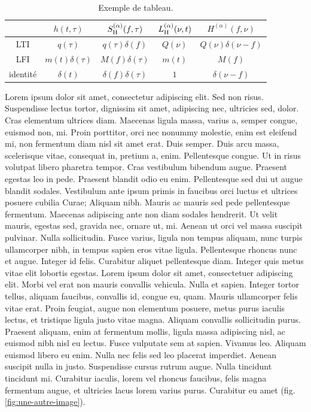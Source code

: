 \begin{table}[ht]
  \begin{center}
    \begin{tabular}{|c|c|c|c|c|}
      \hline
      & $h(t,\tau)$ & $S_{\mathrm{H}}^{(\alpha)} (f,\tau)$ & $L_{\mathrm{H}}^{(\alpha)} (\nu,t)$ & $H^{(\alpha)}(f,\nu)$ \\
      \hline
      LTI & $q(\tau)$ & $q(\tau) \delta(f)$ & $Q(\nu)$ & $Q(\nu) \delta(\nu-f)$ \\
      \hline
      LFI & $m(t) \delta(\tau)$ & $M(f) \delta(\tau)$ & $m(t)$ & $M(f)$\\
      \hline
      identité & $\delta(t)$ & $\delta(f)\delta(\tau)$ & $1$ & $\delta(\nu-f)$\\
      \hline
    \end{tabular}
    \caption{Exemple de tableau.}
    \label{tab:un-tableau}
  \end{center}
\end{table}

Lorem ipsum dolor sit amet, consectetur adipiscing elit. Sed non risus. Suspendisse lectus tortor, dignissim sit amet, adipiscing nec, ultricies sed, dolor. Cras elementum ultrices diam. Maecenas ligula massa, varius a, semper congue, euismod non, mi. Proin porttitor, orci nec nonummy molestie, enim est eleifend mi, non fermentum diam nisl sit amet erat. Duis semper. Duis arcu massa, scelerisque vitae, consequat in, pretium a, enim. Pellentesque congue. Ut in risus volutpat libero pharetra tempor. Cras vestibulum bibendum augue. Praesent egestas leo in pede. Praesent blandit odio eu enim. Pellentesque sed dui ut augue blandit sodales. Vestibulum ante ipsum primis in faucibus orci luctus et ultrices posuere cubilia Curae; Aliquam nibh. Mauris ac mauris sed pede pellentesque fermentum. Maecenas adipiscing ante non diam sodales hendrerit. Ut velit mauris, egestas sed, gravida nec, ornare ut, mi. Aenean ut orci vel massa suscipit pulvinar. Nulla sollicitudin. Fusce varius, ligula non tempus aliquam, nunc turpis ullamcorper nibh, in tempus sapien eros vitae ligula. Pellentesque rhoncus nunc et augue. Integer id felis. Curabitur aliquet pellentesque diam. Integer quis metus vitae elit lobortis egestas. Lorem ipsum dolor sit amet, consectetuer adipiscing elit. Morbi vel erat non mauris convallis vehicula. Nulla et sapien. Integer tortor tellus, aliquam faucibus, convallis id, congue eu, quam. Mauris ullamcorper felis vitae erat. Proin feugiat, augue non elementum posuere, metus purus iaculis lectus, et tristique ligula justo vitae magna. Aliquam convallis sollicitudin purus. Praesent aliquam, enim at fermentum mollis, ligula massa adipiscing nisl, ac euismod nibh nisl eu lectus. Fusce vulputate sem at sapien. Vivamus leo. Aliquam euismod libero eu enim. Nulla nec felis sed leo placerat imperdiet. Aenean suscipit nulla in justo. Suspendisse cursus rutrum augue. Nulla tincidunt tincidunt mi. Curabitur iaculis, lorem vel rhoncus faucibus, felis magna fermentum augue, et ultricies lacus lorem varius purus. Curabitur eu amet (fig. \ref{fig:une-autre-image}).


